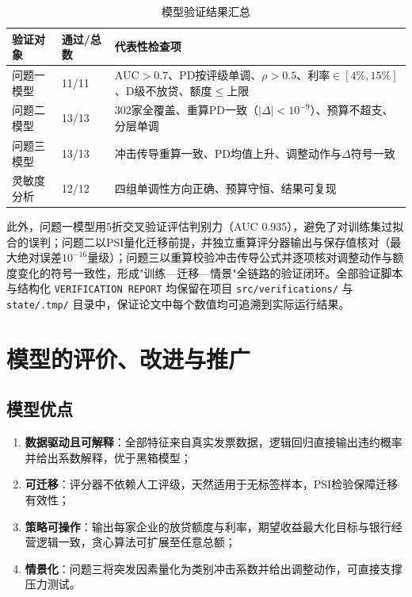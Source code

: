 \documentclass[12pt, a4paper]{article}
\begin{document}
\begin{table}[H]
\centering
\caption{模型验证结果汇总}
\label{tab:verify}
{\footnotesize
\begin{tabular}{p{2.4cm}p{1.7cm}p{7.8cm}}
\toprule
\textbf{验证对象} & \textbf{通过/总数} & \textbf{代表性检查项} \\
\midrule
问题一模型 & 11/11 & AUC$>0.7$、PD按评级单调、$\rho>0.5$、利率$\in[4\%,15\%]$、D级不放贷、额度$\le$上限 \\
问题二模型 & 13/13 & 302家全覆盖、重算PD一致（$|\Delta|<10^{-9}$）、预算不超支、分层单调 \\
问题三模型 & 13/13 & 冲击传导重算一致、PD均值上升、调整动作与$\Delta$符号一致 \\
灵敏度分析 & 12/12 & 四组单调性方向正确、预算守恒、结果可复现 \\
\bottomrule
\end{tabular}}
\end{table}

此外，问题一模型用5折交叉验证评估判别力（AUC 0.935），避免了对训练集过拟合的误判；问题二以PSI量化迁移前提，并独立重算评分器输出与保存值核对（最大绝对误差$10^{-16}$量级）；问题三以重算校验冲击传导公式并逐项核对调整动作与额度变化的符号一致性，形成"训练—迁移—情景"全链路的验证闭环。全部验证脚本与结构化 \texttt{VERIFICATION REPORT} 均保留在项目 \texttt{src/verifications/} 与 \texttt{state/.tmp/} 目录中，保证论文中每个数值均可追溯到实际运行结果。

\section{模型的评价、改进与推广}

\subsection{模型优点}

\begin{enumerate}
    \item \textbf{数据驱动且可解释}：全部特征来自真实发票数据，逻辑回归直接输出违约概率并给出系数解释，优于黑箱模型；
    \item \textbf{可迁移}：评分器不依赖人工评级，天然适用于无标签样本，PSI检验保障迁移有效性；
    \item \textbf{策略可操作}：输出每家企业的放贷额度与利率，期望收益最大化目标与银行经营逻辑一致，贪心算法可扩展至任意总额；
    \item \textbf{情景化}：问题三将突发因素量化为类别冲击系数并给出调整动作，可直接支撑压力测试。
\end{enumerate}
\end{document}
